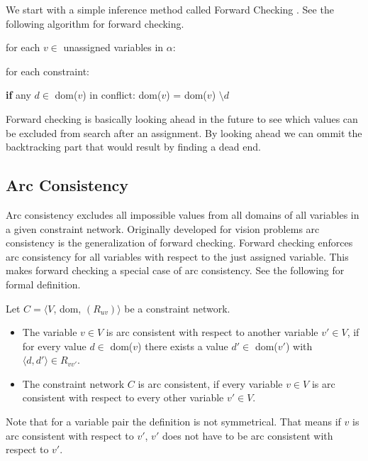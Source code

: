 We start with a simple inference method called Forward Checking \cite{forward_checking:1980}. See the following algorithm for forward checking.

\begin{tcolorbox}[title={function ForwardChecking($C, \alpha$)}]
	for each $v \in $ unassigned variables in $\alpha$:

	for each constraint:

	\textbf{if} any $d \in$ dom($v$) in conflict:
	dom($v$) = dom($v$) $\setminus d$
\end{tcolorbox}

Forward checking is basically looking ahead in the future to see which values can be excluded from search after an assignment. By looking ahead we can ommit the backtracking part that would result by finding a dead end.

\subsection{Arc Consistency}

Arc consistency excludes all impossible values from all domains of all variables in a given constraint network. Originally developed for vision problems \cite{original_arc:1988} arc consistency is the generalization of forward checking. Forward checking enforces arc consistency for all variables with respect to the just assigned variable. This makes forward checking a special case of arc consistency. See the following for formal definition.

\begin{tcolorbox}[title=Definition: Arc Consistent]
	Let $C = \langle V$, dom, $(R_{uv})\rangle$ be a constraint network.
	\begin{itemize}
		\item The variable $v \in V$ is arc consistent with respect to another variable $v'\in V$, if for every value $d \in$ dom($v$) there exists a value $d' \in$ dom($v'$) with $\langle d, d' \rangle \in R_{vv'}$.
		\item The constraint network $C$ is arc consistent, if every variable $v \in V$ is arc consistent with respect to every other variable $v' \in V$.
	\end{itemize}
\end{tcolorbox}

Note that for a variable pair the definition is not symmetrical. That means if $v$ is arc consistent with respect to $v'$, $v'$ does not have to be arc consistent with respect to $v'$.

